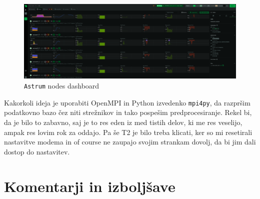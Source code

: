 \documentclass[a4paper]{article}
\begin{document}
\begin{figure}[H]
    \includegraphics[height=0.4\textheight, left]{./astrum-dashboard.png}
    \caption{\texttt{Astrum} nodes dashboard}
    \label{fig:astrum-dash}
\end{figure}

Kakorkoli ideja je uporabiti OpenMPI in Python izvedenko \texttt{mpi4py}, da razpršim podatkovno
bazo čez niti strežnikov in tako pospešim predprocesiranje. Rekel bi, da je bilo to zabavno, saj je 
to res eden iz med tistih delov, ki me res veselijo, ampak res lovim rok za oddajo. Pa še T2 je 
bilo treba klicati, ker so mi resetirali nastavitve modema in of course ne zaupajo svojim strankam
dovolj, da bi jim dali dostop do nastavitev. \\

\section{Komentarji in izboljšave}

\newpage


\end{document}
